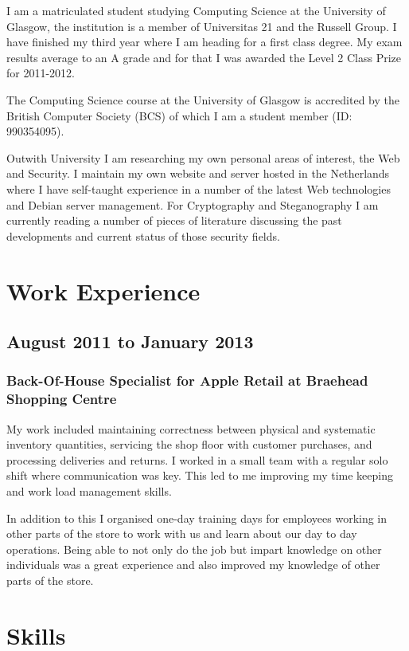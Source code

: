 \documentclass[11pt,a4paper]{article}
\begin{document}
I am a matriculated student studying Computing Science at the University of
Glasgow, the institution is a member of Universitas 21 and the Russell Group.
I have finished my third year where I am heading for a first class degree.
My exam results average to an A grade and for that I was awarded the Level 2
Class Prize for 2011-2012.

The Computing Science course at the University of Glasgow is accredited by the
British Computer Society (BCS) of which I am a student member (ID: 990354095).

Outwith University I am researching my own personal areas of interest, the
Web and Security. I maintain my own website and server hosted in the
Netherlands where I have self-taught experience in a number of the latest Web
technologies and Debian server management. For Cryptography and Steganography
I am currently reading a number of pieces of literature discussing the past
developments and current status of those security fields.

\section*{Work Experience}

\subsection*{August 2011 to January 2013}

\subsubsection*{Back-Of-House Specialist for Apple Retail at Braehead
Shopping Centre}

My work included maintaining correctness between physical and systematic
inventory quantities, servicing the shop floor with customer purchases, and
processing deliveries and returns. I worked in a small team with a regular
solo shift where communication was key. This led to me improving my time
keeping and work load management skills.

In addition to this I organised one-day training days for employees working in
other parts of the store to work with us and learn about our day to day
operations. Being able to not only do the job but impart knowledge on other
individuals was a great experience and also improved my knowledge of other
parts of the store.

\section*{Skills}
\end{document}
